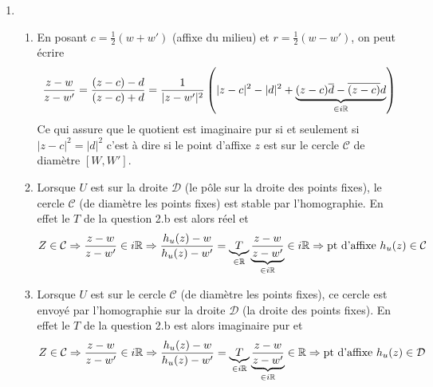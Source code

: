 \begin{enumerate}
\item 
\begin{enumerate}
  \item En posant $c=\frac{1}{2}(w+w')$ (affixe du milieu) et $r = \frac{1}{2}(w-w')$, on peut écrire
\begin{displaymath}
\frac{z-w}{z-w'} = \frac{(z-c)-d}{(z-c) + d} 
= \frac{1}{|z-w'|^2}\left(|z-c|^2-|d|^2 
+\underset{\in i\mathbb{R}}{\underbrace{(z-c)\overline{d}-\overline{(z-c)}d}} \right) 
\end{displaymath}
Ce qui assure que le quotient est imaginaire pur si et seulement si $|z-c|^2=|d|^2$ c'est à dire si le point d'affixe $z$ est sur le cercle $\mathcal{C}$ de diamètre $[W,W']$.

  \item Lorsque $U$ est sur la droite $\mathcal{D}$ (le pôle sur la droite des points fixes), le cercle $\mathcal{C}$ (de diamètre les points fixes) est stable par l'homographie.\newline
En effet le $T$ de la question 2.b est alors réel et
\begin{displaymath}
Z\in \mathcal{C}\Rightarrow \frac{z-w}{z-w'}\in i\mathbb{R}
\Rightarrow \frac{h_u(z)-w}{h_u(z)-w'} = 
\underset{\in \mathbb{R}}{\underbrace{T}}\,
\underset{\in i\mathbb{R}}{\underbrace{\frac{z-w}{z-w'}}}
\in i\mathbb{R}
\Rightarrow \text{pt d'affixe }h_u(z) \in \mathcal{C}
\end{displaymath}

  \item Lorsque $U$ est sur le cercle $\mathcal{C}$ (de diamètre les points fixes), ce cercle est envoyé par l'homographie sur la droite $\mathcal{D}$ (la droite des points fixes).\newline
En effet le $T$ de la question 2.b est alors imaginaire pur et
\begin{displaymath}
Z\in \mathcal{C}\Rightarrow \frac{z-w}{z-w'}\in i\mathbb{R}
\Rightarrow \frac{h_u(z)-w}{h_u(z)-w'} = 
\underset{\in i\mathbb{R}}{\underbrace{T}}\,
\underset{\in i\mathbb{R}}{\underbrace{\frac{z-w}{z-w'}}}
\in \mathbb{R}
\Rightarrow \text{pt d'affixe }h_u(z) \in \mathcal{D}
\end{displaymath}

\end{enumerate}


\end{enumerate}

